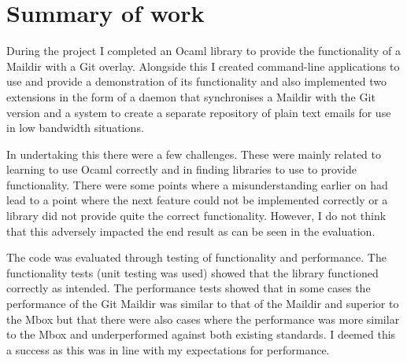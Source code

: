 \section{Summary of work}

During the project I completed an Ocaml library to provide the functionality of a Maildir with a Git overlay. Alongside this I created command-line applications to use and provide a demonstration of its functionality and also implemented two extensions in the form of a daemon that synchronises a Maildir with the Git version and a system to create a separate repository of plain text emails for use in low bandwidth situations.

In undertaking this there were a few challenges. These were mainly related to learning to use Ocaml correctly and in finding libraries to use to provide functionality. There were some points where a misunderstanding earlier on had lead to a point where the next feature could not be implemented correctly or a library did not provide quite the correct functionality. However, I do not think that this adversely impacted the end result as can be seen in the evaluation.

The code was evaluated through testing of functionality and performance. The functionality tests (unit testing was used) showed that the library functioned correctly as intended. The performance tests showed that in some cases the performance of the Git Maildir was similar to that of the Maildir and superior to the Mbox but that there were also cases where the performance was more similar to the Mbox and underperformed against both existing standards. I deemed this a success as this was in line with my expectations for performance.

